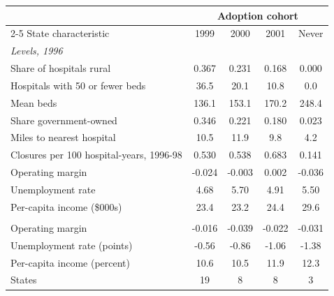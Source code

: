 \begin{tabular}{lcccc}
\toprule
 & \multicolumn{4}{c}{Adoption cohort} \\
\cmidrule(lr){2-5}
State characteristic & 1999 & 2000 & 2001 & Never \\
\midrule
\multicolumn{5}{l}{\textit{Levels, 1996}} \\
Share of hospitals rural & 0.367 & 0.231 & 0.168 & 0.000 \\
Hospitals with 50 or fewer beds & 36.5 & 20.1 & 10.8 & 0.0 \\
Mean beds & 136.1 & 153.1 & 170.2 & 248.4 \\
Share government-owned & 0.346 & 0.221 & 0.180 & 0.023 \\
Miles to nearest hospital & 10.5 & 11.9 & 9.8 & 4.2 \\
Closures per 100 hospital-years, 1996-98 & 0.530 & 0.538 & 0.683 & 0.141 \\
Operating margin & -0.024 & -0.003 & 0.002 & -0.036 \\
Unemployment rate & 4.68 & 5.70 & 4.91 & 5.50 \\
Per-capita income (\$000s) & 23.4 & 23.2 & 24.4 & 29.6 \\
\addlinespace
\multicolumn{5}{l}{\textit{Changes, 1996 to 1998}} \\
Operating margin & -0.016 & -0.039 & -0.022 & -0.031 \\
Unemployment rate (points) & -0.56 & -0.86 & -1.06 & -1.38 \\
Per-capita income (percent) & 10.6 & 10.5 & 11.9 & 12.3 \\
\midrule
States & 19 & 8 & 8 & 3 \\
\bottomrule
\end{tabular}
